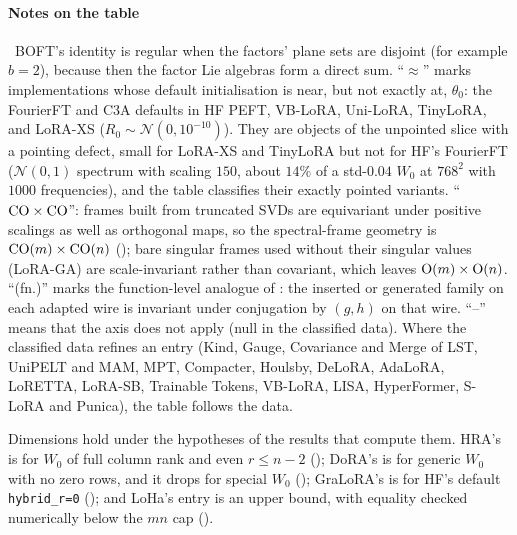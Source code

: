 \paragraph{Notes on the table}
\textdagger\ BOFT's identity is regular when the factors' plane sets are disjoint (for example $b=2$), because then the
factor Lie algebras form a direct sum. ``$\approx$'' marks implementations whose default initialisation is near, but not
exactly at, $\theta_0$: the FourierFT and C3A defaults in HF PEFT, VB-LoRA, Uni-LoRA, TinyLoRA, and LoRA-XS
($R_0\sim\mathcal N(0,10^{-10})$). They are objects of the unpointed slice with a pointing defect, small for LoRA-XS and
TinyLoRA but not for HF's FourierFT ($\mathcal N(0,1)$ spectrum with scaling $150$, about $14\%$ of a std-$0.04$ $W_0$
at $768^2$ with $1000$ frequencies), and the table classifies their exactly pointed variants. ``$\mathrm{CO}\times\mathrm{CO}$'': frames
built from truncated SVDs are equivariant under positive scalings as well as orthogonal maps, so the spectral-frame
geometry is $\mathrm{CO}(m)\times\mathrm{CO}(n)$ (); bare singular frames used without their singular values
(LoRA-GA) are scale-invariant rather than covariant, which leaves $\mathrm{O}(m)\times\mathrm{O}(n)$. ``(fn.)'' marks the
function-level analogue of : the inserted or generated family on each adapted wire is
invariant under conjugation by $(g,h)$ on that wire. ``--'' means that the axis does not apply (null in the classified
data). Where the classified data refines an entry (Kind, Gauge, Covariance and Merge of LST, UniPELT and MAM, MPT,
Compacter, Houlsby, DeLoRA, AdaLoRA, LoRETTA, LoRA-SB, Trainable Tokens, VB-LoRA, LISA, HyperFormer, S-LoRA and Punica),
the table follows the data.

Dimensions hold under the hypotheses of the results that compute them. HRA's is for $W_0$ of full column rank and even
$r\le n-2$ (); DoRA's is for generic $W_0$ with no zero rows, and it drops for special $W_0$
(); GraLoRA's is for HF's default \texttt{hybrid\_r=0} (); and
LoHa's entry is an upper bound, with equality checked numerically below the $mn$ cap ().

